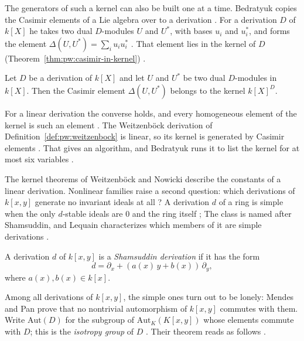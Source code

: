 The generators of such a kernel can also be built one at a time. Bedratyuk
copies the Casimir elements of a Lie algebra over to a derivation
\cite[p.~2]{Bedratyuk2005Casimir}. For a derivation $D$ of $k[X]$ he takes
two dual $D$-modules $U$ and $U^{*}$, with bases $u_{i}$ and $u^{*}_{i}$, and
forms the element $\Delta(U,U^{*})=\sum_{i}u_{i}u^{*}_{i}$
\cite[Definition~2.4, p.~2]{Bedratyuk2005Casimir}. That element lies in the
kernel of $D$ (Theorem~\ref{thm:pw:casimir-in-kernel}) \cite[Theorem~2.2, p.~2]{Bedratyuk2005Casimir}.

\begin{theorem}\label{thm:pw:casimir-in-kernel}
Let $D$ be a derivation of $k[X]$ and let $U$ and $U^{*}$ be two dual
$D$-modules in $k[X]$. Then the Casimir element $\Delta(U,U^{*})$ belongs to
the kernel $k[X]^{D}$.
\end{theorem}

For a linear derivation the converse holds, and every homogeneous element of
the kernel is such an element
\cite[Theorem~2.3, pp.~2--3]{Bedratyuk2005Casimir}. The Weitzenb\"ock
derivation of Definition~\ref{def:pw:weitzenbock} is linear, so its kernel is
generated by Casimir elements \cite[pp.~3--4]{Bedratyuk2005Casimir}. That
gives an algorithm, and Bedratyuk runs it to list the kernel for at most six
variables \cite[p.~1]{Bedratyuk2005Casimir}.

The kernel theorems of Weitzenb\"ock and Nowicki describe the constants of
a linear derivation. Nonlinear families raise a second question: which
derivations of $k[x,y]$ generate no invariant ideals at all
\cite[p.~2031]{Baltazar2016}? A derivation $d$ of a ring is simple when
the only $d$-stable ideals are $0$ and the ring itself
\cite[p.~2031]{Baltazar2016}; The class is named after Shamsuddin, and Lequain characterizes
which members of it are simple derivations
\cite[pp.~801--807]{Lequain2008Simple}.

\begin{definition}\label{def:pw:shamsuddin}
A derivation $d$ of $k[x,y]$ is a \emph{Shamsuddin derivation} if it has
the form
\begin{equation*}
d=\partial_{x}+(a(x)\,y+b(x))\,\partial_{y},
\end{equation*}
where $a(x),b(x)\in k[x]$.
\end{definition}

Among all derivations of $k[x,y]$, the simple ones turn out to be lonely:
Mendes and Pan prove that no nontrivial automorphism of $k[x,y]$ commutes
with them. Write $\mathrm{Aut}(D)$ for the subgroup of
$\mathrm{Aut}_{K}(K[x,y])$ whose elements commute with $D$; this is the
\emph{isotropy group} of $D$ \cite[p.~2]{MendesPan2017}. Their theorem
reads as follows \cite[p.~2]{MendesPan2017}.

